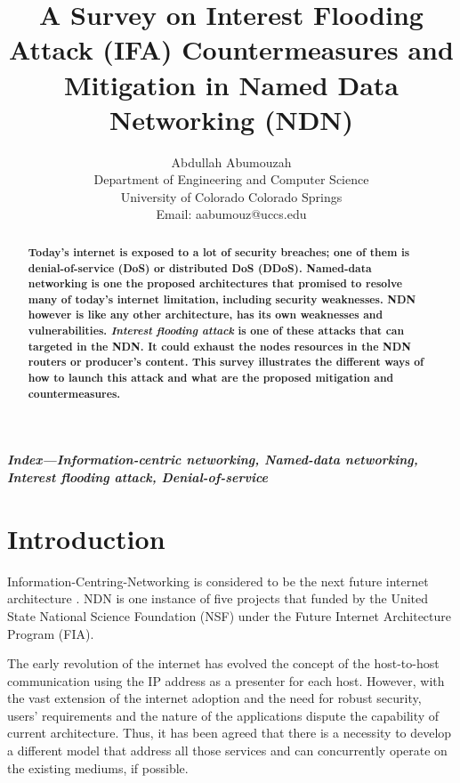 \documentclass[twocolumn]{article}
\begin{document}
\title{A Survey on Interest Flooding Attack (IFA) Countermeasures and Mitigation in Named Data Networking (NDN)}

\author{Abdullah Abumouzah\\
Department of Engineering and Computer Science\\
University of Colorado Colorado Springs\\
Email: aabumouz@uccs.edu}





\maketitle

\begin{abstract}
\textbf{Today's internet is exposed to a lot of security breaches; one of them is denial-of-service (DoS) or distributed DoS (DDoS). Named-data networking is one the proposed architectures that promised to resolve many of today's internet limitation, including security weaknesses. NDN however is like any other architecture, has its own weaknesses and vulnerabilities. \textit{Interest flooding attack} is one of these attacks that can targeted in the NDN. It could exhaust the nodes resources in the NDN routers or producer's content. This survey illustrates the different ways of how to launch this attack and what are the proposed mitigation and countermeasures.}   

\end{abstract}

\textbf{\textit{Index---Information-centric networking, Named-data networking, Interest flooding attack, Denial-of-service}}

\section{Introduction}
Information-Centring-Networking is considered to be the next future internet architecture \cite{6231276}. NDN is one instance of five projects that funded by the United State National Science Foundation (NSF) under the Future Internet Architecture Program (FIA).

The early revolution of the internet has evolved the concept of the host-to-host communication using the IP address as a presenter for each host. However, with the vast extension of the internet adoption and the need for robust security, users’ requirements and the nature of the applications dispute the capability of current architecture. Thus, it has been agreed that there is a necessity to develop a different model that address all those services and can concurrently operate on the existing mediums, if possible.  
\end{document}
